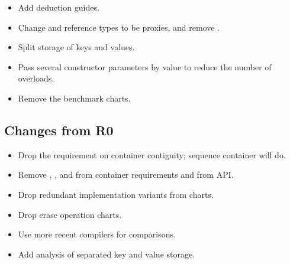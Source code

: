 \documentclass{article}
\begin{document}
\begin{itemize}
  \item Add deduction guides.
  \item Change  and reference types to be proxies, and remove
    .
  \item Split storage of keys and values.
  \item Pass several constructor parameters by value to reduce the number of overloads.
  \item Remove the benchmark charts.
\end{itemize}

\subsection{Changes from R0}

\begin{itemize}
  \item Drop the requirement on container contiguity; sequence container will
    do.
  \item Remove , , and 
    from container requirements and from  API.
  \item Drop redundant implementation variants from charts.
  \item Drop erase operation charts.
  \item Use more recent compilers for comparisons.
  \item Add analysis of separated key and value storage.
\end{itemize}


\end{document}
